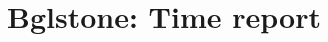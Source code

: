 \documentclass[10pt]{article}
\begin{document}
\title{\huge{\textbf{Bglstone: Time report}}}
\maketitle
\end{document}
